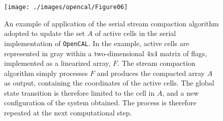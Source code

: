 \begin{figure}
	\begin{center}
		\texttt{[image: ./images/opencal/Figure06]}
		\caption{An example of application of the serial stream compaction algorithm
			adopted to update the set $A$ of active cells in the serial
			implementation of \texttt{OpenCAL}. In the example, active cells are
			represented in gray within a two-dimensional 4x4 matrix of flags,
			implemented as a linearized array, $F$. The stream compaction
			algorithm simply processes $F$ and produces the compacted array $A$ as
			output, containing the coordinates of the active cells. The global
			state transition is therefore limited to the cell in $A$, and a new
			configuration of the system obtained. The process is therefore
			repeated at the next computational step.}
		\label{fig:active_cells}
	\end{center}
\end{figure}

